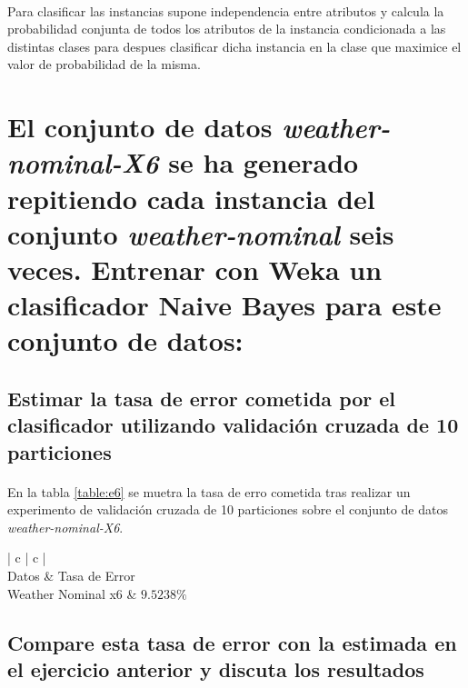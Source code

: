 \documentclass{article}
\begin{document}
			\paragraph{}
			Para clasificar las instancias supone independencia entre atributos y calcula la probabilidad conjunta de todos los atributos de la instancia condicionada a las distintas clases para despues clasificar dicha instancia en la clase que maximice el valor de probabilidad de la misma.

	\section{El conjunto de datos \emph{weather-nominal-X6} se ha generado repitiendo cada instancia del conjunto \emph{weather-nominal} seis veces. Entrenar con Weka un clasificador Naive Bayes para este conjunto de datos:}
	\label{sec:e6}

		\subsection{Estimar la tasa de error cometida por el clasificador utilizando validación cruzada de 10 particiones}

			\paragraph{}
			En la tabla \ref{table:e6} se muetra la tasa de erro cometida tras realizar un experimento de validación cruzada de 10 particiones sobre el conjunto de datos \emph{weather-nominal-X6}.

			\begin{table}[H]
				\centering
				\begin{tabu}{ | c | c | }
					\hline
					 \\ \hline
					Datos	& Tasa de Error \\ \hline
					Weather Nominal x6		& $9.5238\%$	\\
					\hline
				\end{tabu}
				\caption{Validación Cruzada de 10 particiones con Naive Bayes}
				\label{table:e6}
			\end{table}

		\subsection{Compare esta tasa de error con la estimada en el ejercicio anterior y discuta los resultados}
\end{document}
